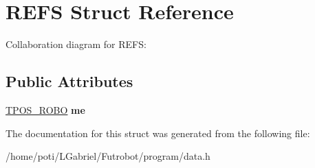 \hypertarget{structREFS}{}\section{R\+E\+FS Struct Reference}
\label{structREFS}


Collaboration diagram for R\+E\+FS\+:
\subsection*{Public Attributes}
\begin{DoxyCompactItemize}
\item 
\hyperlink{structTPOS__ROBO}{T\+P\+O\+S\+\_\+\+R\+O\+BO} {\bfseries me}\hypertarget{structREFS_a1f2ca6f0787c68e5c0b1c0f0aba9234b}{}\label{structREFS_a1f2ca6f0787c68e5c0b1c0f0aba9234b}

\end{DoxyCompactItemize}


The documentation for this struct was generated from the following file\+:\begin{DoxyCompactItemize}
\item 
/home/poti/\+L\+Gabriel/\+Futrobot/program/data.\+h\end{DoxyCompactItemize}
